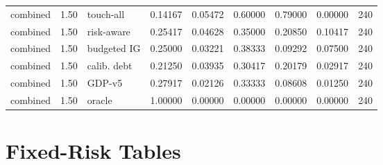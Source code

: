 \documentclass{article}
\begin{document}
\begin{center}
\begin{longtable}{lllllllll}
combined & 1.50 & touch-all & 0.14167 & 0.05472 & 0.60000 & 0.79000 & 0.00000 & 240 \\
combined & 1.50 & risk-aware & 0.25417 & 0.04628 & 0.35000 & 0.20850 & 0.10417 & 240 \\
combined & 1.50 & budgeted IG & 0.25000 & 0.03221 & 0.38333 & 0.09292 & 0.07500 & 240 \\
combined & 1.50 & calib. debt & 0.21250 & 0.03935 & 0.30417 & 0.20179 & 0.02917 & 240 \\
combined & 1.50 & GDP-v5 & 0.27917 & 0.02126 & 0.33333 & 0.08608 & 0.01250 & 240 \\
combined & 1.50 & oracle & 1.00000 & 0.00000 & 0.00000 & 0.00000 & 0.00000 & 240 \\
\bottomrule
\end{longtable}
\renewcommand{\arraystretch}{1.0}
\end{center}

\clearpage
\section{Fixed-Risk Tables}
\end{document}
